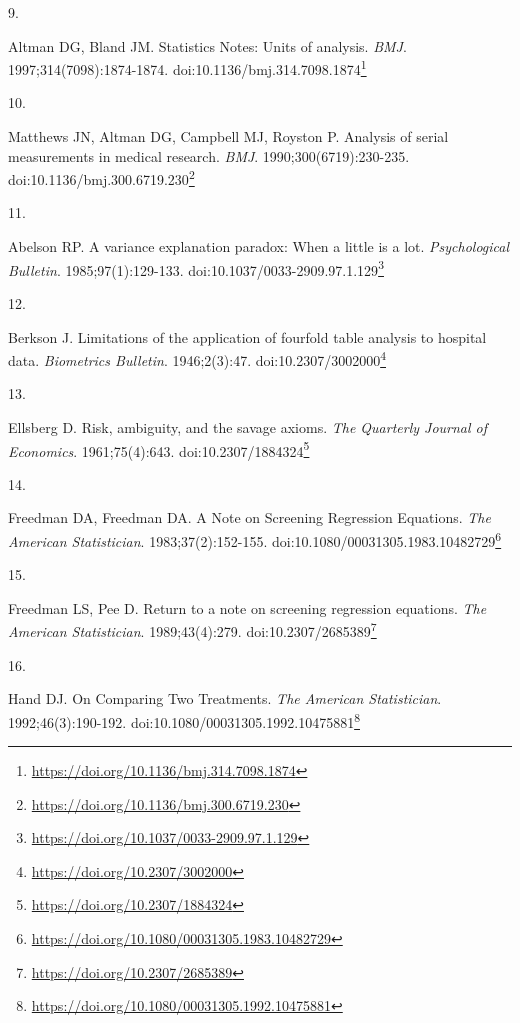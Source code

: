 \documentclass[
  a4paper,
]{book}
\newlength{\cslhangindent}
\newlength{\csllabelwidth}
\newlength{\cslentryspacingunit} %
\newenvironment{CSLReferences}[2] %
 {%
  \setlength{\parindent}{0pt}
  \ifodd #1
  \let\oldpar\par
  \def\par{\hangindent=\cslhangindent\oldpar}
  \fi
  \setlength{\parskip}{#2\cslentryspacingunit}
 }%
 {}
\newcommand{\CSLLeftMargin}[1]{\parbox[t]{\csllabelwidth}{#1}}
\newcommand{\CSLRightInline}[1]{\parbox[t]{\linewidth - \csllabelwidth}{#1}\break}
\renewcommand{\href}[2]{#2\footnote{\url{#1}}}
\begin{document}
\begin{CSLReferences}{0}{0}
\leavevmode{}%
\CSLLeftMargin{9. }%
\CSLRightInline{Altman DG, Bland JM. Statistics Notes: Units of analysis. \emph{BMJ}. 1997;314(7098):1874-1874. doi:\href{https://doi.org/10.1136/bmj.314.7098.1874}{10.1136/bmj.314.7098.1874}}

\leavevmode{}%
\CSLLeftMargin{10. }%
\CSLRightInline{Matthews JN, Altman DG, Campbell MJ, Royston P. Analysis of serial measurements in medical research. \emph{BMJ}. 1990;300(6719):230-235. doi:\href{https://doi.org/10.1136/bmj.300.6719.230}{10.1136/bmj.300.6719.230}}

\leavevmode{}%
\CSLLeftMargin{11. }%
\CSLRightInline{Abelson RP. A variance explanation paradox: When a little is a lot. \emph{Psychological Bulletin}. 1985;97(1):129-133. doi:\href{https://doi.org/10.1037/0033-2909.97.1.129}{10.1037/0033-2909.97.1.129}}

\leavevmode{}%
\CSLLeftMargin{12. }%
\CSLRightInline{Berkson J. Limitations of the application of fourfold table analysis to hospital data. \emph{Biometrics Bulletin}. 1946;2(3):47. doi:\href{https://doi.org/10.2307/3002000}{10.2307/3002000}}

\leavevmode{}%
\CSLLeftMargin{13. }%
\CSLRightInline{Ellsberg D. Risk, ambiguity, and the savage axioms. \emph{The Quarterly Journal of Economics}. 1961;75(4):643. doi:\href{https://doi.org/10.2307/1884324}{10.2307/1884324}}

\leavevmode{}%
\CSLLeftMargin{14. }%
\CSLRightInline{Freedman DA, Freedman DA. A Note on Screening Regression Equations. \emph{The American Statistician}. 1983;37(2):152-155. doi:\href{https://doi.org/10.1080/00031305.1983.10482729}{10.1080/00031305.1983.10482729}}

\leavevmode{}%
\CSLLeftMargin{15. }%
\CSLRightInline{Freedman LS, Pee D. Return to a note on screening regression equations. \emph{The American Statistician}. 1989;43(4):279. doi:\href{https://doi.org/10.2307/2685389}{10.2307/2685389}}

\leavevmode{}%
\CSLLeftMargin{16. }%
\CSLRightInline{Hand DJ. On Comparing Two Treatments. \emph{The American Statistician}. 1992;46(3):190-192. doi:\href{https://doi.org/10.1080/00031305.1992.10475881}{10.1080/00031305.1992.10475881}}


\end{CSLReferences}
\end{document}
